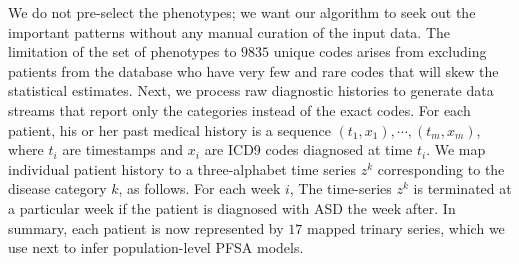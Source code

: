 \documentclass[onecolumn, compsoc,11pt]{IEEEtran}
\begin{document}
We do not pre-select the phenotypes; we want our algorithm to seek out the important patterns without any manual curation of the input data. The limitation of the set of phenotypes to $9835$ unique codes arises from excluding patients from the database who have very few and rare codes that will skew the statistical estimates. Next, we process raw diagnostic histories to generate data streams that report only the categories instead of the exact codes. For each patient, his or her  past  medical history is a sequence $(t_1,x_1),\cdots,(t_m,x_m)$, where $t_i$ are timestamps and $x_i$ are ICD9 codes diagnosed at time $t_i$.  We map individual patient history to a three-alphabet  time series $z^k$ corresponding to the disease category $k$,  as follows. For each week $i$,
The time-series $z^k$ is terminated at a particular week if the patient is diagnosed with ASD the week after. 
In summary, each patient is now represented by $17$ mapped trinary series, which we  use next  to infer population-level PFSA models. 

     
\end{document}
